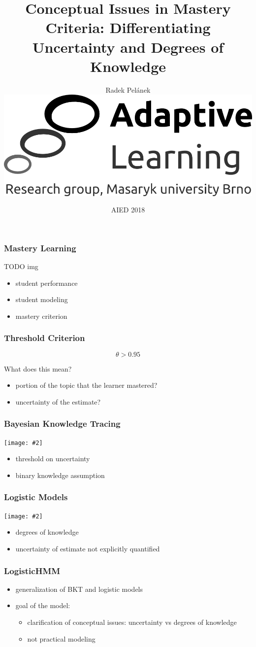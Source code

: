 \documentclass[bigger]{beamer}
\title{Conceptual Issues in Mastery Criteria: Differentiating Uncertainty and
  Degrees of Knowledge}
\author{Radek Pel\'anek\\[10mm]
\includegraphics[width=.3\linewidth]{al-logo}
}
\date{AIED 2018}
\newcommand{\img}[2]{
  \begin{center}
    \texttt{[image: \#2]}
  \end{center}
}
\begin{document}
\frame{\titlepage}

\begin{frame}
  \frametitle{Mastery Learning}

  TODO img
  \begin{itemize}
  \item student performance
  \item student modeling
  \item mastery criterion
  \end{itemize}
\end{frame}

\begin{frame}
  \frametitle{Threshold Criterion}

  \[ \theta > 0.95 \]

  What does this mean?

  \begin{itemize}
  \item portion of the topic that the learner mastered?
  \item uncertainty of the estimate?
  \end{itemize}
\end{frame}

\begin{frame}
  \frametitle{Bayesian Knowledge Tracing}

  \img{.5}{bkt}

  \begin{itemize}
  \item threshold on uncertainty
  \item binary knowledge assumption
  \end{itemize}
\end{frame}

\begin{frame}
  \frametitle{Logistic Models}

  \img{.5}{logistic}

  \begin{itemize}
  \item degrees of knowledge
  \item uncertainty of estimate not explicitly quantified
  \end{itemize}
\end{frame}

\begin{frame}
  \frametitle{LogisticHMM}

  \begin{itemize}
  \item generalization of BKT and logistic models
  \item goal of the model:
    \begin{itemize}
    \item clarification of conceptual issues: uncertainty vs degrees of
      knowledge
    \item not practical modeling
    \end{itemize}
  \end{itemize}
\end{frame}
\end{document}
